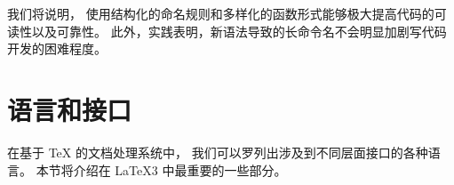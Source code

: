 \documentclass[full]{l3doc}
\begin{document}
我们将说明，
使用结构化的命名规则和多样化的函数形式能够极大提高代码的可读性以及可靠性。
此外，实践表明，新语法导致的长命令名不会明显加剧写代码开发的困难程度。

%
\section{语言和接口}
%
%

在基于 \TeX{} 的文档处理系统中，
我们可以罗列出涉及到不同层面接口的各种语言。
本节将介绍在 \LaTeX3 中最重要的一些部分。
\end{document}
